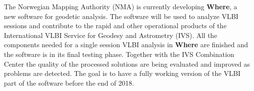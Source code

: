 The Norwegian Mapping Authority (NMA) is currently developing \textbf{Where}, a new software for geodetic analysis. The
software will be used to analyze VLBI sessions and contribute to the rapid and other operational products of the
International VLBI Service for Geodesy and Astrometry (IVS). All the components needed for a single session VLBI
analysis in \textbf{Where} are finished and the software is in its final testing phase. Together with the IVS
Combination Center the quality of the processed solutions are being evaluated and improved as problems are detected. The goal
is to have a fully working version of the VLBI part of the software before the end of 2018.

\vspace{2cm}
\endinput
